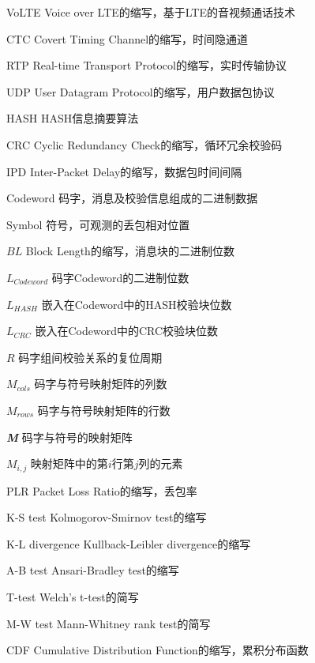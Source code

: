 \begin{denotation}
	
\item[VoLTE] Voice over LTE的缩写，基于LTE的音视频通话技术
\item[CTC] Covert Timing Channel的缩写，时间隐通道
\item[RTP] Real-time Transport Protocol的缩写，实时传输协议
\item[UDP] User Datagram Protocol的缩写，用户数据包协议
\item[HASH] HASH信息摘要算法
\item[CRC] Cyclic Redundancy Check的缩写，循环冗余校验码
\item[IPD] Inter-Packet Delay的缩写，数据包时间间隔
\item[] 
\item[Codeword] 码字，消息及校验信息组成的二进制数据
\item[Symbol] 符号，可观测的丢包相对位置
\item[$BL$] Block Length的缩写，消息块的二进制位数
\item[$L_{Codeword}$] 码字Codeword的二进制位数
\item[$L_{HASH}$] 嵌入在Codeword中的HASH校验块位数
\item[$L_{CRC}$] 嵌入在Codeword中的CRC校验块位数
\item[$R$] 码字组间校验关系的复位周期
\item[$M_{cols}$] 码字与符号映射矩阵的列数
\item[$M_{rows}$] 码字与符号映射矩阵的行数
\item[\textit{\textbf{M}}] 码字与符号的映射矩阵
\item[$M_{i, j}$] 映射矩阵中的第$i$行第$j$列的元素
\item[] 
\item[PLR] Packet Loss Ratio的缩写，丢包率
\item[K-S test] Kolmogorov-Smirnov test的缩写
\item[K-L divergence] Kullback-Leibler divergence的缩写
\item[A-B test] Ansari-Bradley test的缩写
\item[T-test] Welch’s t-test的简写
\item[M-W test] Mann-Whitney rank test的简写
\item[CDF] Cumulative Distribution Function的缩写，累积分布函数

\end{denotation}
